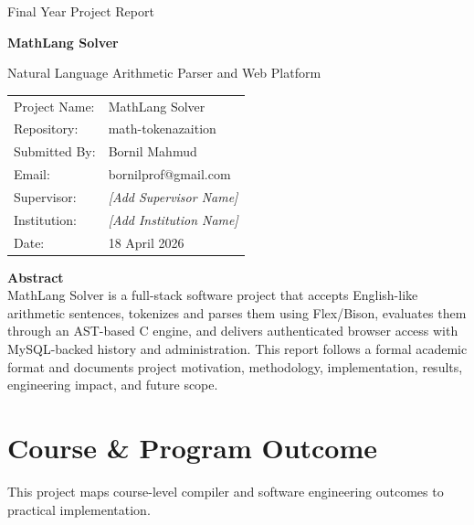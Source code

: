 \documentclass[12pt,a4paper]{report}
\begin{document}
\begin{titlepage}
\centering
{\Large Final Year Project Report \par}
\vspace{0.8cm}
{\huge\bfseries MathLang Solver \par}
\vspace{0.4cm}
{\Large Natural Language Arithmetic Parser and Web Platform \par}
\vspace{1.2cm}

\begin{tabular}{ll}
Project Name: & MathLang Solver \\
Repository: & math-tokenazaition \\
Submitted By: & Bornil Mahmud \\
Email: & bornilprof@gmail.com \\
Supervisor: & \textit{[Add Supervisor Name]} \\
Institution: & \textit{[Add Institution Name]} \\
Date: & 18 April 2026 \\
\end{tabular}

\vfill
\textbf{Abstract}\\
MathLang Solver is a full-stack software project that accepts English-like arithmetic
sentences, tokenizes and parses them using Flex/Bison, evaluates them through an AST-based C
engine, and delivers authenticated browser access with MySQL-backed history and administration.
This report follows a formal academic format and documents project motivation, methodology,
implementation, results, engineering impact, and future scope.
\end{titlepage}


\chapter*{Course \& Program Outcome}

This project maps course-level compiler and software engineering outcomes to practical implementation.
\end{document}
